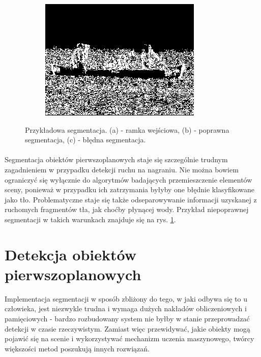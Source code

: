 \begin{figure}[!htb]
\begin{subfigure}[b]{0.3\textwidth}
\includegraphics[width=\textwidth]{img/segBad}
\caption{\label{fig:segBad}}
\end{subfigure}
\caption{Przykładowa segmentacja. (a) - ramka wejściowa, (b) - poprawna segmentacja, (c) - błędna segmentacja. \label{fig:segmentacja}}
\end{figure}

\paragraph{}
Segmentacja obiektów pierwszoplanowych staje się szczególnie trudnym zagadnieniem w przypadku detekcji ruchu na nagraniu. Nie można bowiem ograniczyć się wyłącznie do algorytmów badających przemieszczenie elementów sceny, ponieważ w przypadku ich zatrzymania byłyby one błędnie klasyfikowane jako tło. Problematyczne staje się także odseparowywanie informacji uzyskanej z ruchomych fragmentów tła, jak choćby płynącej wody. Przykład niepoprawnej segmentacji w takich warunkach znajduje się na rys. \ref{fig:segBad}.

\section{Detekcja obiektów pierwszoplanowych}
Implementacja segmentacji w sposób zbliżony do tego, w jaki odbywa się to u człowieka, jest niezwykle trudna i wymaga dużych nakładów obliczeniowych i pamięciowych - bardzo rozbudowany system nie byłby w stanie przeprowadzać detekcji w czasie rzeczywistym. Zamiast więc przewidywać, jakie obiekty mogą pojawić się na scenie i wykorzystywać mechanizm uczenia maszynowego, twórcy większości metod poszukują innych rozwiązań.
